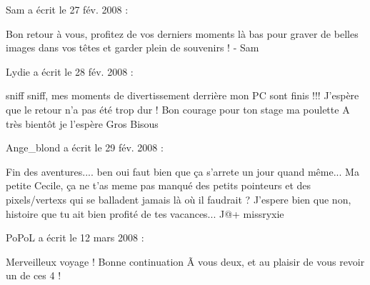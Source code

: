  \medskip
Sam a écrit le 27 fév. 2008 :
\begin{displayquote}
Bon retour à vous, profitez de vos derniers moments là bas pour graver de belles images dans vos têtes et garder plein de souvenirs !
- Sam
\end{displayquote}

 \medskip
Lydie a écrit le 28 fév. 2008 :
\begin{displayquote}
sniff sniff, mes moments de divertissement derrière mon PC sont finis !!!
J'espère que le retour n'a pas été trop dur !
Bon courage pour ton stage ma poulette
A très bientôt je l'espère
Gros Bisous
\end{displayquote}

 \medskip
Ange_blond a écrit le 29 fév. 2008 :
\begin{displayquote}
Fin des aventures.... ben oui faut bien que ça s'arrete un jour quand même...
Ma petite Cecile, ça ne t'as meme pas manqué des petits pointeurs et des pixels/vertexs qui se balladent jamais là où il faudrait ?
J'espere bien que non, histoire que tu ait bien profité de tes vacances... ^^
@+ missryxie
\end{displayquote}

 \medskip
PoPoL a écrit le 12 mars 2008 :
\begin{displayquote}
Merveilleux voyage ! Bonne continuation Ã  vous deux, et au plaisir de vous revoir un de ces 4 !
\end{displayquote}

